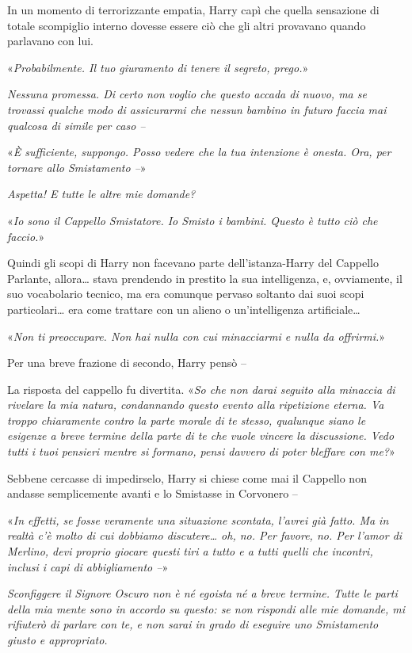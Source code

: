 In un momento di terrorizzante empatia, Harry capì che quella sensazione di totale scompiglio interno dovesse essere ciò che gli altri provavano quando parlavano con lui.

«\textit{Probabilmente. Il tuo giuramento di tenere il segreto, prego.}»

\textit{Nessuna promessa. Di certo non voglio che questo accada di nuovo, ma se trovassi qualche modo di assicurarmi che nessun bambino in futuro faccia mai qualcosa di simile per caso –}

«\textit{È sufficiente, suppongo. Posso vedere che la tua intenzione è onesta. Ora, per tornare allo Smistamento –}»

\textit{Aspetta! E tutte le altre mie domande?}

«\textit{Io sono il Cappello Smistatore. Io Smisto i bambini. Questo è tutto ciò che faccio.}»

Quindi gli scopi di Harry non facevano parte dell’istanza-Harry del Cappello Parlante, allora… stava prendendo in prestito la sua intelligenza, e, ovviamente, il suo vocabolario tecnico, ma era comunque pervaso soltanto dai suoi scopi particolari… era come trattare con un alieno o un’intelligenza artificiale…

«\textit{Non ti preoccupare. Non hai nulla con cui minacciarmi e nulla da offrirmi.}»

Per una breve frazione di secondo, Harry pensò –

La risposta del cappello fu divertita. «\textit{So che non darai seguito alla minaccia di rivelare la mia natura, condannando questo evento alla ripetizione eterna. Va troppo chiaramente contro la parte morale di te stesso, qualunque siano le esigenze a breve termine della parte di te che vuole vincere la discussione. Vedo tutti i tuoi pensieri mentre si formano, pensi davvero di poter bleffare con me?}»

Sebbene cercasse di impedirselo, Harry si chiese come mai il Cappello non andasse semplicemente avanti e lo Smistasse in Corvonero –

«\textit{In effetti, se fosse veramente una situazione scontata, l’avrei già fatto. Ma in realtà c’è molto di cui dobbiamo discutere… oh, no. Per favore, no. Per l’amor di Merlino, devi proprio giocare questi tiri a tutto e a tutti quelli che incontri, inclusi i capi di abbigliamento –}»

\textit{Sconfiggere il Signore Oscuro non è né egoista né a breve termine. Tutte le parti della mia mente sono in accordo su questo: se non rispondi alle mie domande, mi rifiuterò di parlare con te, e non sarai in grado di eseguire uno Smistamento giusto e appropriato.}

